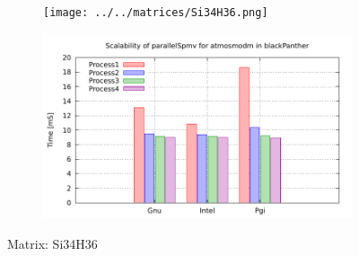 \begin{figure} [ht!]
    \centering
    \captionsetup{justification=centering, singlelinecheck=false}
    \begin{subfigure}{.65\textwidth}
      \centering
      \hspace*{-3.5cm} 
      \texttt{[image: ../../matrices/Si34H36.png]}
      \label{fig:Si34H36_matrix}
    \end{subfigure}%
    \begin{subfigure}{.65\textwidth}
      \centering
      \hspace*{-6.0cm} 
      \includegraphics[page=8, width=0.95\linewidth]{../plots/blackPanther.pdf}
      \label{fig:Si34H36_performance}
    \end{subfigure}
\caption{Matrix: Si34H36}
\label{fig:Si34H36}
\end{figure}


